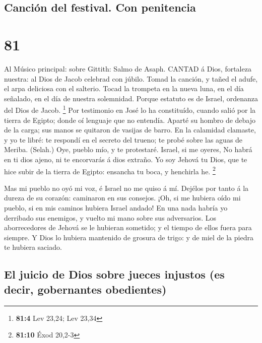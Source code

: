 \hypertarget{canciuxf3n-del-festival.-con-penitencia}{%
\subsection{Canción del festival. Con
penitencia}\label{canciuxf3n-del-festival.-con-penitencia}}

\hypertarget{section-80}{%
\section{81}\label{section-80}}

 Al Músico principal: sobre Gittith: Salmo de Asaph. CANTAD
á Dios, fortaleza nuestra: al Dios de Jacob celebrad con júbilo.
 Tomad la canción, y tañed el adufe, el arpa deliciosa con
el salterio.  Tocad la trompeta en la nueva luna, en el día
señalado, en el día de nuestra solemnidad.  Porque estatuto
es de Israel, ordenanza del Dios de Jacob. \footnote{\textbf{81:4} Lev
  23,24; Lev 23,34}  Por testimonio en José lo ha
constituído, cuando salió por la tierra de Egipto; donde oí lenguaje que
no entendía.  Aparté su hombro de debajo de la carga; sus
manos se quitaron de vasijas de barro.  En la calamidad
clamaste, y yo te libré: te respondí en el secreto del trueno; te probé
sobre las aguas de Meriba. (Selah.)  Oye, pueblo mío, y te
protestaré. Israel, si me oyeres,  No habrá en ti dios
ajeno, ni te encorvarás á dios extraño.  Yo soy Jehová tu
Dios, que te hice subir de la tierra de Egipto: ensancha tu boca, y
henchirla he. \footnote{\textbf{81:10} Éxod 20,2-3}

 Mas mi pueblo no oyó mi voz, é Israel no me quiso á mí.
 Dejélos por tanto á la dureza de su corazón: caminaron en
sus consejos.  ¡Oh, si me hubiera oído mi pueblo, si en mis
caminos hubiera Israel andado!  En una nada habría yo
derribado sus enemigos, y vuelto mi mano sobre sus adversarios.
 Los aborrecedores de Jehová se le hubieran sometido; y el
tiempo de ellos fuera para siempre.  Y Dios lo hubiera
mantenido de grosura de trigo: y de miel de la piedra te hubiera
saciado.

\hypertarget{el-juicio-de-dios-sobre-jueces-injustos-es-decir-gobernantes-obedientes}{%
\subsection{El juicio de Dios sobre jueces injustos (es decir,
gobernantes
obedientes)}\label{el-juicio-de-dios-sobre-jueces-injustos-es-decir-gobernantes-obedientes}}

